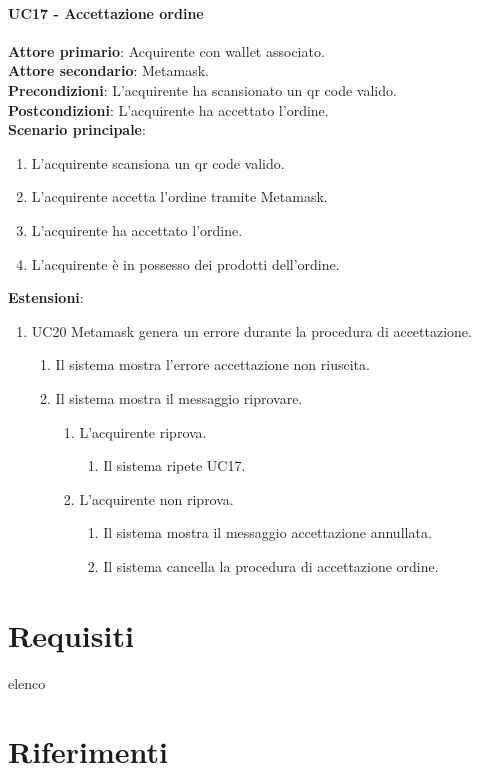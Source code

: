 \documentclass[a4paper, 12pt]{article}
\begin{document}
\paragraph{UC17 - Accettazione ordine}
\textbf{Attore primario}: Acquirente con wallet associato.\\
\textbf{Attore secondario}: Metamask.\\
\textbf{Precondizioni}: L'acquirente ha scansionato un qr code valido.\\
\textbf{Postcondizioni}: L'acquirente ha accettato l'ordine.\\
\textbf{Scenario principale}:
\begin{enumerate}
    \item L'acquirente scansiona un qr code valido.
    \item L'acquirente accetta l'ordine tramite Metamask.
    \item L'acquirente ha accettato l'ordine.
    \item L'acquirente è in possesso dei prodotti dell'ordine.
\end{enumerate}
\textbf{Estensioni}:
\begin{enumerate}
    \item UC20 Metamask genera un errore durante la procedura di accettazione.
    \begin{enumerate}
        \item Il sistema mostra l'errore accettazione non riuscita.
        \item Il sistema mostra il messaggio riprovare.
        \begin{enumerate}
            \item L'acquirente riprova.
            \begin{enumerate}
                \item Il sistema ripete UC17.
            \end{enumerate}
            \item L'acquirente non riprova.
            \begin{enumerate}
                \item Il sistema mostra il messaggio accettazione annullata.
                \item Il sistema cancella la procedura di accettazione ordine.
            \end{enumerate}
        \end{enumerate}
    \end{enumerate}
\end{enumerate}

\section{Requisiti}
elenco

\section{Riferimenti}
\end{document}

